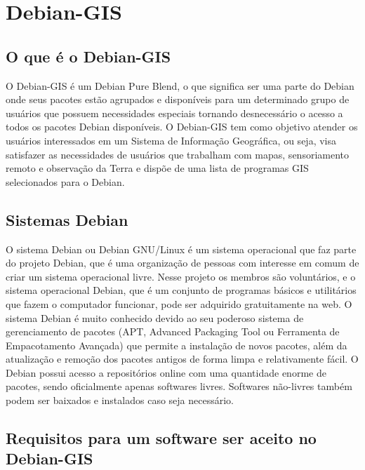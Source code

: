 \chapter{Debian-GIS}
\section{O que é o Debian-GIS}

O Debian-GIS é um Debian Pure Blend, o que significa ser uma parte do Debian onde seus pacotes estão agrupados e disponíveis para um determinado grupo de usuários que possuem necessidades especiais tornando desnecessário o acesso a todos os pacotes Debian disponíveis. O Debian-GIS tem como objetivo atender os usuários interessados em um Sistema de Informação Geográfica, ou seja, visa satisfazer as necessidades de usuários que trabalham com mapas, sensoriamento remoto e observação da Terra e dispõe de uma lista de programas GIS selecionados para o Debian.

\section{Sistemas Debian}

O sistema Debian ou Debian GNU/Linux é um sistema operacional que faz parte do projeto Debian, que é uma organização de pessoas com interesse em comum de criar um sistema operacional livre. Nesse projeto os membros são voluntários, e o sistema operacional Debian, que é um conjunto de programas básicos e utilitários que fazem o computador funcionar, pode ser adquirido gratuitamente na web. O sistema Debian é muito conhecido devido ao seu poderoso sistema de gerenciamento de pacotes (APT, Advanced Packaging Tool ou Ferramenta de Empacotamento Avançada) que permite a instalação de novos pacotes, além da atualização e remoção dos pacotes antigos de forma limpa e relativamente fácil. O Debian possui acesso a repositórios online com uma quantidade enorme de pacotes, sendo oficialmente apenas softwares livres. Softwares não-livres também podem ser baixados e instalados caso seja necessário.

\section{Requisitos para um software ser aceito no Debian-GIS}